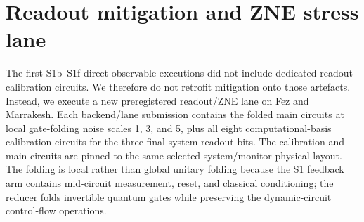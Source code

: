 \documentclass[preprint,aps,physrev,superscriptaddress,floatfix,longbibliography]{revtex4-2}
\begin{document}
\begin{table}[tb]
\centering
\scriptsize
{}
\caption{Compact cross-backend S1--S1f summary. The primary improvement is
control target error minus feedback target error. Direct-observable entries
are feedback-minus-control Pauli expectations or mean absolute separations.}
\label{tab:cross-backend-summary}
\end{table}

\section{Readout mitigation and ZNE stress lane}

The first S1b--S1f direct-observable executions did not include dedicated
readout calibration circuits. We therefore do not retrofit mitigation onto
those artefacts. Instead, we execute a new preregistered readout/ZNE lane on
Fez and Marrakesh. Each backend/lane submission contains the folded main
circuits at local gate-folding noise scales 1, 3, and 5, plus all eight
computational-basis calibration circuits for the three final system-readout
bits. The calibration and main circuits are pinned to the same selected
system/monitor physical layout. The folding is local rather than global
unitary folding because the S1 feedback arm contains mid-circuit measurement,
reset, and classical conditioning; the reducer folds invertible quantum gates
while preserving the dynamic-circuit control-flow operations.
\end{document}
